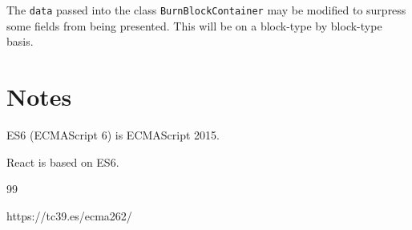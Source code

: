 \documentclass[12pt]{article}
\begin{document}
The \lstinline|data| passed into the class \lstinline|BurnBlockContainer| may be modified to surpress some fields from being
presented.
This will be on a block-type by block-type basis.


%
%
\section{Notes}
%
%

ES6 (ECMAScript 6) is ECMAScript 2015.

React is based on ES6.


%
%
%
%
\begin {thebibliography}{99}
%


https://tc39.es/ecma262/



\end {thebibliography}
\end{document}
